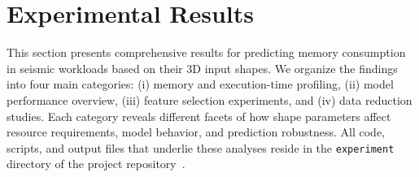 \section{Experimental Results}
\label{sec:pmc-results}

This section presents comprehensive results for predicting memory consumption in seismic workloads based on their \ac{3D} input shapes.
We organize the findings into four main categories:
(i) memory and execution-time profiling,
(ii) model performance overview,
(iii) feature selection experiments,
and (iv) data reduction studies.
Each category reveals different facets of how shape parameters affect resource requirements, model behavior, and prediction robustness.
All code, scripts, and output files that underlie these analyses reside in the \texttt{experiment} directory of the project repository~\cite{delucca2025experiment2results}.





